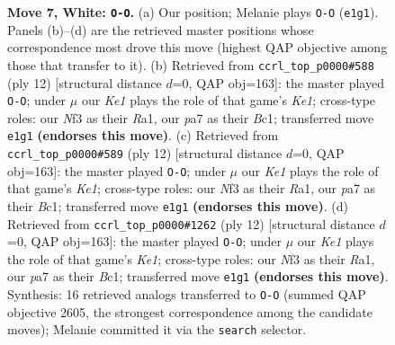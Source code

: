 \documentclass[11pt]{article}
\begin{document}
\begin{figure}[p]
\caption{\textbf{Move 7, White: \texttt{O-O}.} (a) Our position; Melanie plays \texttt{O-O} (\texttt{e1g1}). Panels (b)--(d) are the retrieved master positions whose correspondence most drove this move (highest QAP objective among those that transfer to it). (b) Retrieved from \texttt{ccrl\_top\_p0000\#588} (ply 12) [structural distance $d$=0, QAP obj=163]: the master played \texttt{O-O}; under $\mu$ our \emph{Ke1} plays the role of that game's \emph{Ke1}; cross-type roles: our \emph{N}f3 as their \emph{R}a1, our \emph{p}a7 as their \emph{B}c1; transferred move \texttt{e1g1} \textbf{(endorses this move)}. (c) Retrieved from \texttt{ccrl\_top\_p0000\#589} (ply 12) [structural distance $d$=0, QAP obj=163]: the master played \texttt{O-O}; under $\mu$ our \emph{Ke1} plays the role of that game's \emph{Ke1}; cross-type roles: our \emph{N}f3 as their \emph{R}a1, our \emph{p}a7 as their \emph{B}c1; transferred move \texttt{e1g1} \textbf{(endorses this move)}. (d) Retrieved from \texttt{ccrl\_top\_p0000\#1262} (ply 12) [structural distance $d$=0, QAP obj=163]: the master played \texttt{O-O}; under $\mu$ our \emph{Ke1} plays the role of that game's \emph{Ke1}; cross-type roles: our \emph{N}f3 as their \emph{R}a1, our \emph{p}a7 as their \emph{B}c1; transferred move \texttt{e1g1} \textbf{(endorses this move)}. Synthesis: 16 retrieved analogs transferred to \texttt{O-O} (summed QAP objective 2605, the strongest correspondence among the candidate moves); Melanie committed it via the \texttt{search} selector.}
\label{fig:thought-m12}
\end{figure}

\clearpage
\end{document}
